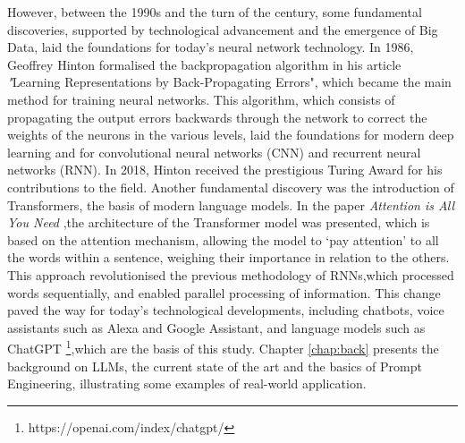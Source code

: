 However, between the 1990s and the turn of the century, some fundamental discoveries, supported by technological advancement and the emergence of Big Data, laid the foundations for today's neural network technology.
In 1986, Geoffrey Hinton formalised the backpropagation algorithm in his article \textit"{Learning Representations by Back-Propagating Errors}"\cite{Rumelhart1986LearningRB},  which became the main method for training neural networks. 
This algorithm, which consists of propagating the output errors backwards through the network to correct the weights of the neurons in the various levels, laid the foundations for modern deep learning and for convolutional neural networks (CNN)\cite{Cnn} and recurrent neural networks (RNN)\cite{Rnn}.
In 2018, Hinton received the prestigious Turing Award for his contributions to the field.
Another fundamental discovery was the introduction of Transformers, the basis of modern language models. 
In the paper \textit{Attention is All You Need} \cite{Attention},the architecture of the Transformer model was presented, which is based on the attention mechanism, allowing the model to ‘pay attention’ to all the words within a sentence, weighing their importance in relation to the others.
This approach revolutionised the previous methodology of RNNs\cite{Rnn},which processed words sequentially, and enabled parallel processing of information.
This change paved the way for today's technological developments, including chatbots, voice assistants such as Alexa and Google Assistant, and language models such as ChatGPT \footnote{https://openai.com/index/chatgpt/},which are the basis of this study. 
Chapter \ref{chap:back} presents the background on LLMs, the current state of the art and the basics of Prompt Engineering, illustrating some examples of real-world application.
